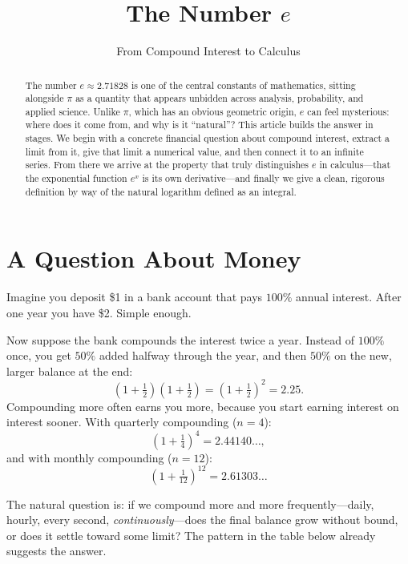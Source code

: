 \documentclass{essay}
\title{The Number \(e\)}
\subtitle{From Compound Interest to Calculus}
\author{}
\date{}
\begin{document}
\maketitle

\begin{abstract}
  \noindent The number \(e \approx 2.71828\) is one of the central constants of mathematics, sitting alongside \(\pi\) as a quantity that appears unbidden across analysis, probability, and applied science. Unlike \(\pi\), which has an obvious geometric origin, \(e\) can feel mysterious: where does it come from, and why is it ``natural''? This article builds the answer in stages. We begin with a concrete financial question about compound interest, extract a limit from it, give that limit a numerical value, and then connect it to an infinite series. From there we arrive at the property that truly distinguishes \(e\) in calculus---that the exponential function \(e^{x}\) is its own derivative---and finally we give a clean, rigorous definition by way of the natural logarithm defined as an integral.
\end{abstract}

\section{A Question About Money}

Imagine you deposit \$1 in a bank account that pays \(100\%\) annual interest. After one year you have \$2. Simple enough.

Now suppose the bank compounds the interest twice a year. Instead of \(100\%\) once, you get \(50\%\) added halfway through the year, and then \(50\%\) on the new, larger balance at the end:
\[ \left(1 + \tfrac{1}{2}\right)\left(1 + \tfrac{1}{2}\right) = \left(1 + \tfrac{1}{2}\right)^{2} = 2.25. \]
Compounding more often earns you more, because you start earning interest on interest sooner. With quarterly compounding (\(n = 4\)):
\[ \left(1 + \tfrac{1}{4}\right)^{4} = 2.44140\ldots, \]
and with monthly compounding (\(n = 12\)):
\[ \left(1 + \tfrac{1}{12}\right)^{12} = 2.61303\ldots \]

The natural question is: if we compound more and more frequently---daily, hourly, every second, \emph{continuously}---does the final balance grow without bound, or does it settle toward some limit? The pattern in the table below already suggests the answer.
\end{document}
